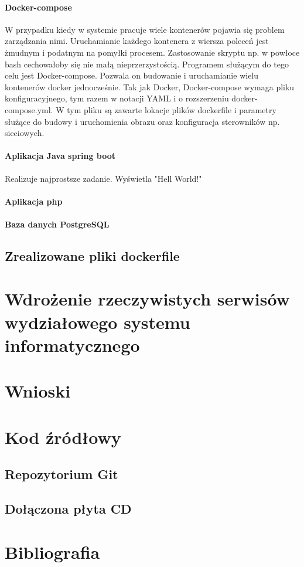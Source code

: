 \documentclass[polish, a4paper, 12pt, oneside]{book}
\begin{document}
\subsubsection{Docker-compose}
W przypadku kiedy w systemie pracuje wiele kontenerów pojawia się problem zarządzania nimi. Uruchamianie każdego kontenera z wiersza poleceń jest żmudnym i podatnym na pomyłki procesem. Zastosowanie skryptu np. w powłoce bash cechowałoby się nie małą nieprzerzystością. Programem służącym do tego celu jest Docker-compose. Pozwala on budowanie i uruchamianie wielu kontenerów docker jednocześnie. Tak jak Docker, Docker-compose wymaga pliku konfiguracyjnego, tym razem w notacji YAML i o rozszerzeniu docker-compose.yml. W tym pliku są zawarte lokacje plików dockerfile i parametry służące do budowy i uruchomienia obrazu oraz konfiguracja sterowników np. sieciowych. 
\subsubsection{Aplikacja Java spring boot}
Realizuje najprostsze zadanie. Wyświetla "Hell World!"
\subsubsection{Aplikacja php}

\subsubsection{Baza danych PostgreSQL}

\section{Zrealizowane pliki dockerfile}

\chapter{Wdrożenie rzeczywistych serwisów wydziałowego systemu informatycznego}

\chapter{Wnioski}

\chapter{Kod źródłowy}
\section{Repozytorium Git}
\section{Dołączona płyta CD}

\chapter{Bibliografia}
\end{document}

